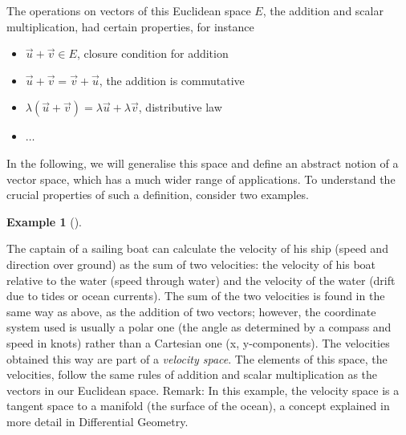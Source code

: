 \documentclass[
  a4paper,
  DIV=11,
  numbers=noendperiod,
  oneside]{scrreprt}
\providecommand{\tightlist}{%
  \setlength{\itemsep}{0pt}\setlength{\parskip}{0pt}}
\theoremstyle{definition}
\newtheorem{example}{Example}[chapter]
\theoremstyle{remark}
\begin{document}
The operations on vectors of this Euclidean space \(E\), the addition
and scalar multiplication, had certain properties, for instance

\begin{itemize}
\tightlist
\item
  \(\vec{u} + \vec{v}  \in  E\), closure condition for addition
\item
  \(\vec{u}+\vec{v}  =  \vec{v}+\vec{u}\), the addition is commutative
\item
  \(\lambda (\vec{u}+ \vec{v})  =  \lambda \vec{u} + \lambda \vec{v}\),
  distributive law
\item
  \(\ldots\)
\end{itemize}

In the following, we will generalise this space and define an abstract
notion of a vector space, which has a much wider range of applications.
To understand the crucial properties of such a definition, consider two
examples.

\begin{example}[]\protect\hypertarget{exm-}{}\label{exm-}

The captain of a sailing boat can calculate the velocity of his ship
(speed and direction over ground) as the sum of two velocities: the
velocity of his boat relative to the water (speed through water) and the
velocity of the water (drift due to tides or ocean currents). The sum of
the two velocities is found in the same way as above, as the addition of
two vectors; however, the coordinate system used is usually a polar one
(the angle as determined by a compass and speed in knots) rather than a
Cartesian one (x, y-components). The velocities obtained this way are
part of a \emph{velocity space}. The elements of this space, the
velocities, follow the same rules of addition and scalar multiplication
as the vectors in our Euclidean space. Remark: In this example, the
velocity space is a tangent space to a manifold (the surface of the
ocean), a concept explained in more detail in Differential Geometry.

\end{example}
\end{document}
